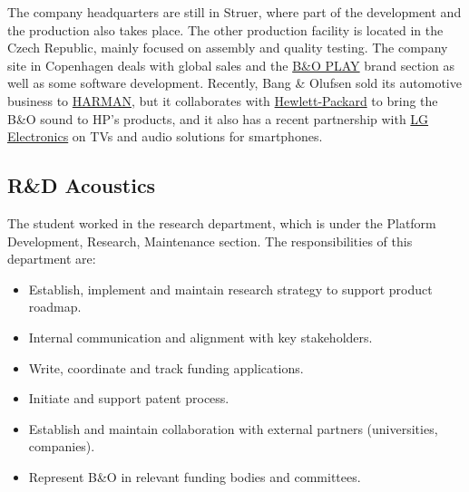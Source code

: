 The company headquarters are still in Struer, where part of the development and the production also takes place. The other production facility is located in the Czech Republic, mainly focused on assembly and quality testing. The company site in Copenhagen deals with global sales and the \href{https://www.beoplay.com/en}{B\&O PLAY} brand section as well as some software development. Recently, Bang \& Olufsen sold its automotive business to \href{https://www.harman.com}{HARMAN}, but it collaborates with \href{https://www8.hp.com/us/en/home.html}{Hewlett-Packard} to bring the B\&O sound to HP’s products, and it also has a recent partnership with \href{https://www.lg.com/us}{LG Electronics} on TVs and audio solutions for smartphones.

\newpage
%
%


\newpage
\subsection{R\&D Acoustics}
The student worked in the research department, which is under the Platform Development, Research, Maintenance section. The responsibilities of this department are:
\begin{itemize}
	\item Establish, implement and maintain research strategy to support product roadmap.
	\item Internal communication and alignment with key stakeholders.
	\item Write, coordinate and track funding applications.
	\item Initiate and support patent process.
	\item Establish and maintain collaboration with external partners (universities, companies).
	\item Represent B\&O in relevant funding bodies and committees.
\end{itemize}

